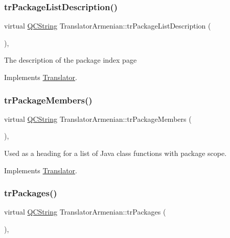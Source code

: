 \subsubsection{\texorpdfstring{trPackageListDescription()}{trPackageListDescription()}}
{\footnotesize\ttfamily virtual \mbox{\hyperlink{class_q_c_string}{Q\+C\+String}} Translator\+Armenian\+::tr\+Package\+List\+Description (\begin{DoxyParamCaption}{ }\end{DoxyParamCaption})\hspace{0.3cm}{\ttfamily [inline]}, {\ttfamily [virtual]}}

The description of the package index page 

Implements \mbox{\hyperlink{class_translator}{Translator}}.

\mbox{\label{class_translator_armenian_af0069086ea06fcc63b3b993cf1d111ad}} 
\subsubsection{\texorpdfstring{trPackageMembers()}{trPackageMembers()}}
{\footnotesize\ttfamily virtual \mbox{\hyperlink{class_q_c_string}{Q\+C\+String}} Translator\+Armenian\+::tr\+Package\+Members (\begin{DoxyParamCaption}{ }\end{DoxyParamCaption})\hspace{0.3cm}{\ttfamily [inline]}, {\ttfamily [virtual]}}

Used as a heading for a list of Java class functions with package scope. 

Implements \mbox{\hyperlink{class_translator}{Translator}}.

\mbox{\label{class_translator_armenian_ae047d9c27caa4d50f359c4a24a792a04}} 
\subsubsection{\texorpdfstring{trPackages()}{trPackages()}}
{\footnotesize\ttfamily virtual \mbox{\hyperlink{class_q_c_string}{Q\+C\+String}} Translator\+Armenian\+::tr\+Packages (\begin{DoxyParamCaption}{ }\end{DoxyParamCaption})\hspace{0.3cm}{\ttfamily [inline]}, {\ttfamily [virtual]}}

